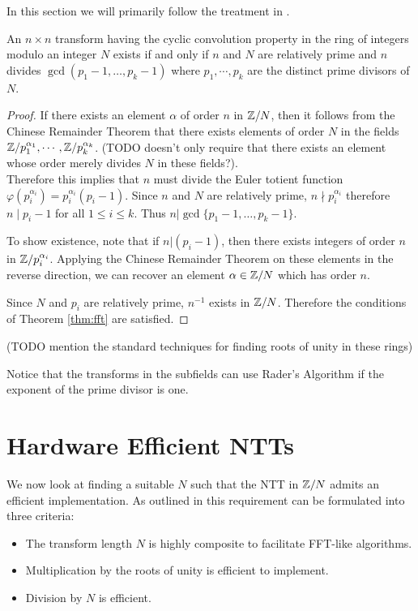 In this section we will primarily follow the treatment in \cite{intro-to-fmt}.

\begin{theorem}\label{thm:fmt-transform-length}
    An $n \times n$ transform having the cyclic convolution property in the ring of integers modulo an integer $N$ exists if and only if $n$ and $N$ are relatively prime and $n$ divides $\gcd(p_1 - 1, \ldots, p_k - 1)$ where $p_1, \cdots, p_k$ are the distinct prime divisors of $N$.
\end{theorem}

\begin{proof}
    If there exists an element $\alpha$ of order $n$ in ${\mathbb Z}/N$, then it follows from the Chinese Remainder Theorem that there exists elements of order $N$ in the fields ${\mathbb Z}/p_1^{\alpha_1}, \cdots, {\mathbb Z}/p_k^{\alpha_k}$. (TODO doesn't only require that there exists an element whose order merely divides $N$ in these fields?).\\
    Therefore this implies that $n$ must divide the Euler totient function $\varphi(p_i^{\alpha_i}) = p_i^{\alpha_i}(p_i - 1)$. Since $n$ and $N$ are relatively prime, $n \nmid p_i^{\alpha_i}$ therefore $n \mid p_i - 1$ for all $1 \le i \le k$. Thus $n | \gcd\{p_1 - 1, \ldots, p_k - 1\}$.

    \medskip

    To show existence, note that if $n | (p_i - 1)$, then there exists integers of order $n$ in ${\mathbb Z}/p_i^{\alpha_i}$. Applying the Chinese Remainder Theorem on these elements in the reverse direction, we can recover an element $\alpha \in {\mathbb Z}/N$ which has order $n$.

    \medskip

    Since $N$ and $p_i$ are relatively prime, $n^{-1}$ exists in ${\mathbb Z}/N$. Therefore the conditions of Theorem \ref{thm:fft} are satisfied.
\end{proof}

(TODO mention the standard techniques for finding roots of unity in these rings)

Notice that the transforms in the subfields can use Rader's Algorithm if the exponent of the prime divisor is one.


\section{Hardware Efficient NTTs}%
\label{sec:hardware-efficient-ntt}

We now look at finding a suitable $N$ such that the NTT in ${\mathbb Z} / N$ admits an efficient implementation. As outlined in \cite{intro-to-fmt} this requirement can be formulated into three criteria:
\begin{itemize}
    \item The transform length $N$ is highly composite to facilitate FFT-like algorithms.
    \item Multiplication by the roots of unity is efficient to implement.
    \item Division by $N$ is efficient.
\end{itemize}

